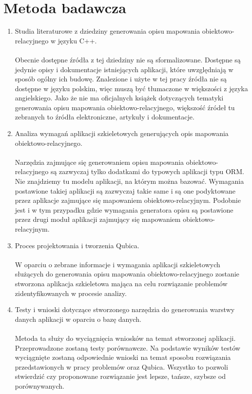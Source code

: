 \documentclass[12pt]{report}
\begin{document}
\section{Metoda badawcza}
\begin{enumerate}
\item Studia literaturowe z dziedziny generowania opisu mapowania obiektowo-relacyjnego w języku C++. \\ \\
Obecnie dostępne źródła z tej dziedziny nie są sformalizowane. Dostępne są jedynie opisy i dokumentacje istniejących aplikacji, które uwzględniają
w sposób ogólny ich budowę. Znalezione i użyte w tej pracy źródła nie są dostępne w języku polskim, więc muszą być tłumaczone w większości z języka angielskiego.
Jako że nie ma oficjalnych książek dotyczących tematyki generowania opisu mapowania obiektowo-relacyjnego, większość źródeł tu zebranych to źródła elektroniczne, artykuły i dokumentacje.
\item Analiza wymagań aplikacji szkieletowych generujących opis mapowania obie\-ktowo-relacyjnego. \\ \\
Narzędzia zajmujące się generowaniem opisu mapowania obiektowo-relacyj\-nego są zazwyczaj tylko dodatkami do typowych aplikacji typu ORM. Nie znajdziemy tu
modelu aplikacji, na którym można bazować. Wymagania postawione takiej aplikacji są zazwyczaj takie same i są one podyktowane przez aplikacje zajmujące się mapowaniem obiektowo-relacyjnym. Podobnie jest i w tym przypadku gdzie wymagania generatora opisu są postawione przez drugi moduł aplikacji zajmujący się mapowaniem obiektowo-relacyjnym.
\item Proces projektowania i tworzenia Qubica. \\ \\
W oparciu o zebrane informacje i wymagania aplikacji szkieletowych służą\-cych do generowania opisu mapowania obiektowo-relacyjnego zostanie stworzona aplikacja szkieletowa mająca na celu rozwiązanie problemów zidentyfikowanych w procesie analizy.
\item Testy i wnioski dotyczące stworzonego narzędzia do generowania warstwy danych aplikacji w oparciu o bazę danych. \\ \\
Metoda ta służy do wyciągnięcia wniosków na temat stworzonej aplikacji. Przeprowadzone zostaną testy porównawcze. Na podstawie wyników testów wyciągnięte zostaną odpowiednie wnioski na temat sposobu rozwiązania przedstawionych w pracy problemów oraz Qubica. Wszystko to pozwoli stwierdzić czy proponowane rozwiązanie jest lepsze, tańsze, szybsze od porównywanych.

\end{enumerate}
\end{document}
